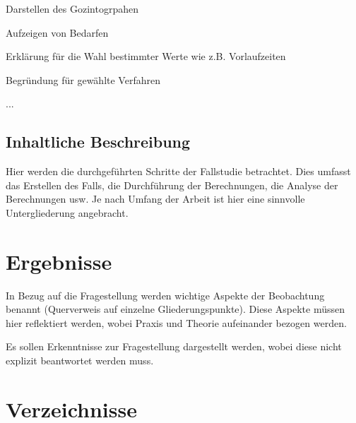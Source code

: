 \documentclass[12pt,a4paper, listof=entryprefix, bibliography=totocnumbered,toc=listofnumbered,lof=listofnumbered]{scrartcl}
\newcounter{verzeichnis}
\begin{document}
\begin{compactitem}
	\item Darstellen des Gozintogrpahen
	\item Aufzeigen von Bedarfen
	\item Erklärung für die Wahl bestimmter Werte wie z.B. Vorlaufzeiten
	\item Begründung für gewählte Verfahren
	\item ...
\end{compactitem}


\subsection{Inhaltliche Beschreibung}
\label{ch:inhalt}
Hier werden die durchgeführten Schritte der Fallstudie betrachtet. Dies umfasst das Erstellen des Falls, die Durchführung der Berechnungen, die Analyse der Berechnungen usw. Je nach Umfang der Arbeit ist hier eine sinnvolle Untergliederung angebracht.

\pagebreak

\section{Ergebnisse}
\label{ch:ergebnisse}
In Bezug auf die Fragestellung werden wichtige Aspekte der Beobachtung benannt (Querverweis auf einzelne Gliederungspunkte). Diese Aspekte müssen hier reflektiert werden, wobei Praxis und Theorie aufeinander bezogen werden.

Es sollen Erkenntnisse zur Fragestellung dargestellt werden, wobei diese nicht explizit beantwortet werden muss.
\pagebreak


	 \label{Verzeichnisse}
	\renewcommand{\thesection}{\Roman{verzeichnis}}
	\section*{Verzeichnisse}
	\renewcommand{\refname}{Literaturverzeichnis}
	\printbibliography
	\pagebreak
	
	\listoffigures
	\pagebreak
	
\end{document}

